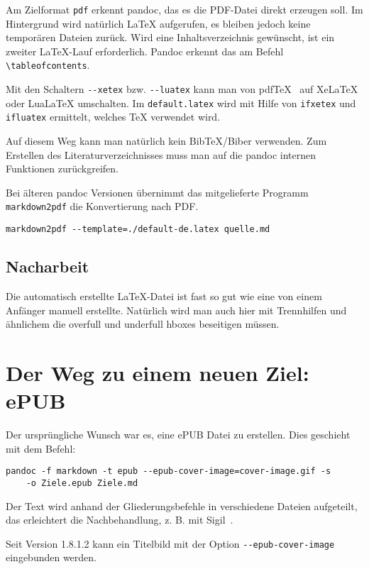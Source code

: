 \documentclass[11pt,ngerman,a4paper]{article}
\begin{document}
Am Zielformat \texttt{pdf} erkennt pandoc, das es die PDF-Datei direkt
erzeugen soll. Im Hintergrund wird natürlich LaTeX aufgerufen, es
bleiben jedoch keine temporären Dateien zurück. Wird eine
Inhaltsverzeichnis gewünscht, ist ein zweiter LaTeX-Lauf erforderlich.
Pandoc erkennt das am Befehl \texttt{\textbackslash{}tableofcontents}.

Mit den Schaltern \texttt{-{}-xetex} bzw. \texttt{-{}-luatex} kann man
von pdfTeX~ auf XeLaTeX oder LuaLaTeX umschalten. Im
\texttt{default.latex} wird mit Hilfe von \texttt{ifxetex} und
\texttt{ifluatex} ermittelt, welches TeX verwendet wird.

Auf diesem Weg kann man natürlich kein BibTeX/Biber verwenden. Zum
Erstellen des Literaturverzeichnisses muss man auf die pandoc internen
Funktionen zurückgreifen.

Bei älteren pandoc Versionen übernimmt das mitgelieferte Programm
\texttt{markdown2pdf} die Konvertierung nach PDF.

\begin{verbatim}
markdown2pdf --template=./default-de.latex quelle.md
\end{verbatim}

\subsection{Nacharbeit}\label{nacharbeit}

Die automatisch erstellte LaTeX-Datei ist fast so gut wie eine von einem
Anfänger manuell erstellte. Natürlich wird man auch hier mit Trennhilfen
und ähnlichem die overfull und underfull hboxes beseitigen müssen.

\section{Der Weg zu einem neuen Ziel:
ePUB}\label{der-weg-zu-einem-neuen-ziel-epub}

Der ursprüngliche Wunsch war es, eine ePUB Datei zu erstellen. Dies
geschieht mit dem Befehl:

\begin{verbatim}
pandoc -f markdown -t epub --epub-cover-image=cover-image.gif -s
    -o Ziele.epub Ziele.md
\end{verbatim}

Der Text wird anhand der Gliederungsbefehle in verschiedene Dateien
aufgeteilt, das erleichtert die Nachbehandlung, z. B. mit
Sigil~\autocite{sigil}.

Seit Version 1.8.1.2 kann ein Titelbild mit der Option
\texttt{-{}-epub-cover-image} eingebunden werden.
\end{document}
